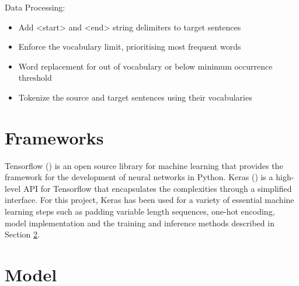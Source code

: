 Data Processing:
\begin{itemize}
    \item Add <start> and <end> string delimiters to target sentences
    \item Enforce the vocabulary limit, prioritising most frequent words
    \item Word replacement for out of vocabulary or below minimum occurrence threshold
    \item Tokenize the source and target sentences using their vocabularies
\end{itemize}

\section{Frameworks}
\label{sec:3-frameworks}

Tensorflow (\cite{tensorflow_2015}) is an open source library for machine learning that provides the framework for the development of neural networks in Python.
Keras (\cite{keras_2015}) is a high-level API for Tensorflow that encapsulates the complexities through a simplified interface.
For this project, Keras has been used for a variety of essential machine learning steps such as padding variable length sequences, one-hot encoding, model implementation and the training and inference methods described in Section \ref{sec:3-model}.







\section{Model}
\label{sec:3-model}
